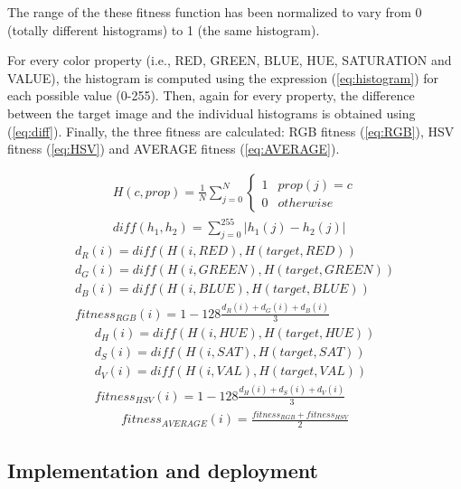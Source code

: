 The range of the these fitness function has been normalized to vary from 0 (totally different histograms) to 1 (the same histogram).

For every color property (i.e., RED, GREEN, BLUE, HUE, SATURATION and VALUE), the histogram is computed using the expression (\ref{eq:histogram}) for each possible value (0-255). Then, again for every property, the difference between the target image and the individual histograms is obtained using (\ref{eq:diff}). Finally, the three fitness are calculated: RGB fitness (\ref{eq:RGB}), HSV fitness (\ref{eq:HSV}) and AVERAGE fitness (\ref{eq:AVERAGE}).

\begin{eqnarray}
  \label{eq:histogram}
  H(c, prop) = \frac{1}{N}\sum_{j=0}^N \left\{\begin{matrix}
1 & prop(j) = c\\ 
0 & otherwise
\end{matrix}\right. \\
\label{eq:diff}
diff(h_1, h_2) = \sum_{j=0}^{255} |h_1(j) - h_2(j)|
\end{eqnarray}
\begin{eqnarray}
  d_R(i) = diff(H(i, RED), H(target, RED))\\
  d_G(i) = diff(H(i, GREEN), H(target, GREEN))\\
  d_B(i) =  diff(H(i, BLUE), H(target, BLUE))\\
  \label{eq:RGB}
  fitness_{RGB}(i) = 1 - 128\frac{d_R(i) + d_G(i) + d_B(i)}{3}
\end{eqnarray}
\begin{eqnarray}
  d_H(i) = diff(H(i, HUE), H(target, HUE))\\
  d_S(i) = diff(H(i, SAT), H(target, SAT))\\
  d_V(i) =  diff(H(i, VAL), H(target, VAL))\\
  \label{eq:HSV}
  fitness_{HSV}(i) = 1 - 128\frac{d_H(i) + d_S(i) + d_V(i)}{3}
\end{eqnarray}
\begin{eqnarray}
  \label{eq:AVERAGE}
  fitness_{AVERAGE}(i) = \frac{fitness_{RGB}+fitness_{HSV}}{2}
\end{eqnarray}




\subsection{Implementation and deployment}



